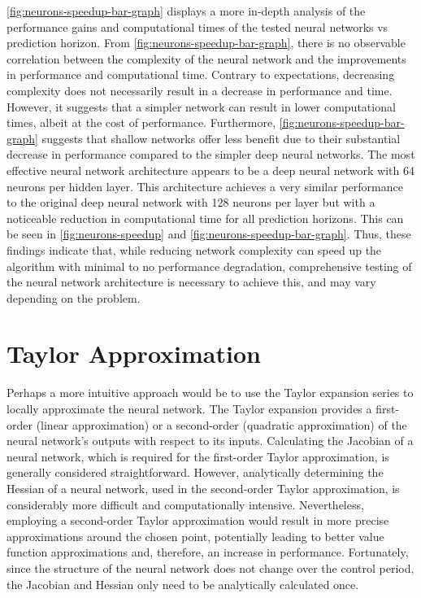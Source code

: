 \autoref{fig:neurons-speedup-bar-graph} displays a more in-depth analysis of the performance gains and computational times of the tested neural networks vs prediction horizon. From \autoref{fig:neurons-speedup-bar-graph}, there is no observable correlation between the complexity of the neural network and the improvements in performance and computational time. Contrary to expectations, decreasing complexity does not necessarily result in a decrease in performance and time. However, it suggests that a simpler network can result in lower computational times, albeit at the cost of performance. Furthermore, \autoref{fig:neurons-speedup-bar-graph} suggests that shallow networks offer less benefit due to their substantial decrease in performance compared to the simpler deep neural networks. The most effective neural network architecture appears to be a deep neural network with 64 neurons per hidden layer. This architecture achieves a very similar performance to the original deep neural network with 128 neurons per layer but with a noticeable reduction in computational time for all prediction horizons. This can be seen in \autoref{fig:neurons-speedup} and \autoref{fig:neurons-speedup-bar-graph}. Thus, these findings indicate that, while reducing network complexity can speed up the algorithm with minimal to no performance degradation, comprehensive testing of the neural network architecture is necessary to achieve this, and may vary depending on the problem.


\section{Taylor Approximation}
Perhaps a more intuitive approach would be to use the Taylor expansion series to locally approximate the neural network. The Taylor expansion provides a first-order (linear approximation) or a second-order (quadratic approximation) of the neural network’s outputs with respect to its inputs. Calculating the Jacobian of a neural network, which is required for the first-order Taylor approximation, is generally considered straightforward. However, analytically determining the Hessian of a neural network, used in the second-order Taylor approximation, is considerably more difficult and computationally intensive. Nevertheless, employing a second-order Taylor approximation would result in more precise approximations around the chosen point, potentially leading to better value function approximations and, therefore, an increase in performance. Fortunately, since the structure of the neural network does not change over the control period, the Jacobian and Hessian only need to be analytically calculated once.

